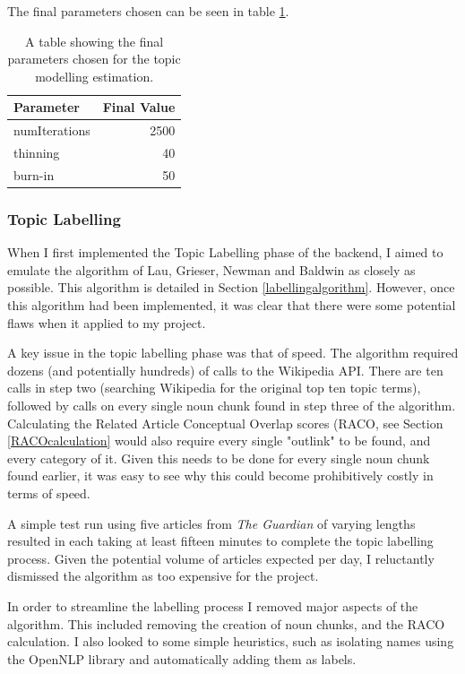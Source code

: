 \documentclass[12pt]{article}
\begin{document}
The final parameters chosen can be seen in table \ref{topicmodellingestimation}.

\begin{table}[H]
	\centering
	\begin{tabular}{l|r}
		\textbf{Parameter} & \textbf{Final Value} \\ \hline
		numIterations & 2500 \\ \hline
		thinning & 40 \\ \hline
		burn-in & 50 \\ \hline
	\end{tabular}
	\caption[Parameters for estimating topic models]{A table showing the final parameters chosen for the topic modelling estimation.}
	\label{topicmodellingestimation}
\end{table}

\subsubsection{Topic Labelling}

When I first implemented the Topic Labelling phase of the backend, I aimed to emulate the algorithm of Lau, Grieser, Newman and Baldwin as closely as possible. This algorithm is detailed in Section \ref{labellingalgorithm}. However, once this algorithm had been implemented, it was clear that there were some potential flaws when it applied to my project.

A key issue in the topic labelling phase was that of speed. The algorithm required dozens (and potentially hundreds) of calls to the Wikipedia API. There are ten calls in step two (searching Wikipedia for the original top ten topic terms), followed by calls on every single noun chunk found in step three of the algorithm. Calculating the Related Article Conceptual Overlap scores (RACO, see Section \ref{RACOcalculation} would also require every single "outlink" to be found, and every category of it. Given this needs to be done for every single noun chunk found earlier, it was easy to see why this could become prohibitively costly in terms of speed. 

A simple test run using five articles from \emph{The Guardian} of varying lengths resulted in each taking at least fifteen minutes to complete the topic labelling process. Given the potential volume of articles expected per day, I reluctantly dismissed the algorithm as too expensive for the project.

In order to streamline the labelling process I removed major aspects of the algorithm. This included removing the creation of noun chunks, and the RACO calculation. I also looked to some simple heuristics, such as isolating names using the OpenNLP library and automatically adding them as labels. \\
\end{document}

